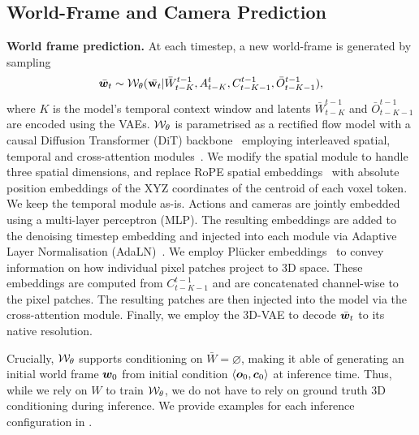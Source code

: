 \documentclass{article}
\theoremstyle{plain}
\theoremstyle{definition}
\theoremstyle{remark}
\begin{document}
\subsection{World-Frame and Camera Prediction}

\textbf{World frame prediction.} At each timestep, a new world-frame is generated by sampling 
\begin{equation}
  \bar{{\bm{w}}}_t \sim {\mathcal{W}}_\theta(\bar{{\mathbf{w}}_t} | \bar{W}^{t-1}_{t-K}, A^t_{t-K}, C^{t-1}_{t-K-1}, \bar{O}^{t-1}_{t-K-1}),  
\end{equation}
where $K$ is the model's temporal context window and latents $\bar{W}^{t-1}_{t-K}$ and $\bar{O}^{t-1}_{t-K-1}$ are encoded using the VAEs. 
${\mathcal{W}}_\theta$ is parametrised as a rectified flow model with a causal Diffusion Transformer (DiT) backbone~\citep{peebles2023scalable} employing interleaved spatial, temporal and cross-attention modules~\citep{decart2024oasis}.
We modify the spatial module to handle three spatial dimensions, and replace RoPE spatial embeddings~\citep{su2024roformer} with absolute position embeddings of the XYZ coordinates of the centroid of each voxel token.
We keep the temporal module as-is.
Actions and cameras are jointly embedded using a multi-layer perceptron (MLP).
The resulting embeddings are added to the denoising timestep embedding and injected into each module via Adaptive Layer Normalisation (AdaLN)~\citep{peebles2023scalable}.
We employ Pl\"ucker embeddings~\citep{xiao2025worldmem,sitzmann2021light} to convey information on how individual pixel patches project to 3D space. These embeddings are computed from $C^{t-1}_{t-K-1}$ and are concatenated channel-wise to the pixel patches.
The resulting patches are then injected into the model via the cross-attention module.
Finally, we employ the 3D-VAE to decode $\bar{{\bm{w}}}_t$ to its native resolution.

Crucially, ${\mathcal{W}}_\theta$ supports conditioning on $\bar{W}=\varnothing$, making it able of generating an initial world frame ${\bm{w}}_0$ from initial condition $\langle {\bm{o}}_0, {\bm{c}}_0 \rangle$ at inference time.
Thus, while we rely on $W$ to train ${\mathcal{W}}_\theta$, we do not have to rely on ground truth 3D conditioning during inference. We provide examples for each inference configuration in .
\end{document}
